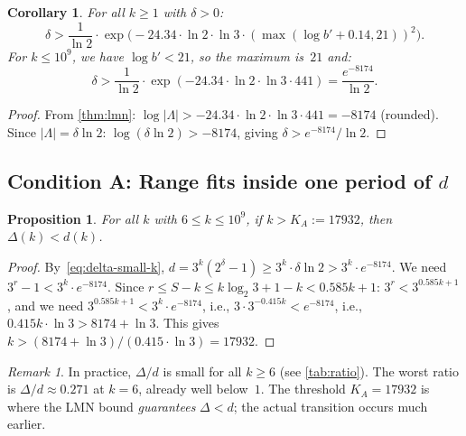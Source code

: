 \documentclass[11pt, a4paper]{amsart}
\theoremstyle{plain}
\newtheorem{proposition}[theorem]{Proposition}
\newtheorem{corollary}[theorem]{Corollary}
\theoremstyle{definition}
\theoremstyle{remark}
\newtheorem{remark}[theorem]{Remark}
\begin{document}
\begin{corollary}\label{cor:delta-bound}
  For all $k \geq 1$ with $\delta > 0$:
  \begin{equation}\label{eq:delta-lower}
    \delta > \frac{1}{\ln 2} \cdot
    \exp\!\bigl(-24.34 \cdot \ln 2 \cdot \ln 3 \cdot
    (\max(\log b' + 0.14, 21))^2\bigr).
  \end{equation}
  For $k \leq 10^9$, we have $\log b' < 21$, so the
  maximum is~$21$ and:
  \begin{equation}\label{eq:delta-small-k}
    \delta > \frac{1}{\ln 2} \cdot
    \exp(-24.34 \cdot \ln 2 \cdot \ln 3 \cdot 441)
    = \frac{e^{-8174}}{\ln 2}.
  \end{equation}
\end{corollary}

\begin{proof}
  From \cref{thm:lmn}: $\log|\Lambda| > -24.34 \cdot \ln 2
  \cdot \ln 3 \cdot 441 = -8174$ (rounded).
  Since $|\Lambda| = \delta \ln 2$:
  $\log(\delta \ln 2) > -8174$, giving
  $\delta > e^{-8174} / \ln 2$.
\end{proof}

\subsection{Condition A: Range fits inside one period of $d$}
\label{ssec:condition-a}

\begin{proposition}\label{prop:cond-a}
  For all $k$ with $6 \leq k \leq 10^9$, if
  $k > K_A := 17932$, then $\Delta(k) < d(k)$.
\end{proposition}

\begin{proof}
  By~\eqref{eq:delta-small-k},
  $d = 3^k(2^\delta - 1) \geq 3^k \cdot \delta \ln 2
  > 3^k \cdot e^{-8174}$.
  We need $3^r - 1 < 3^k \cdot e^{-8174}$.
  Since $r \leq S - k \leq k \log_2 3 + 1 - k < 0.585k + 1$:
  $3^r < 3^{0.585k+1}$, and we need
  $3^{0.585k+1} < 3^k \cdot e^{-8174}$, i.e.,
  $3 \cdot 3^{-0.415k} < e^{-8174}$, i.e.,
  $0.415k \cdot \ln 3 > 8174 + \ln 3$.
  This gives $k > (8174 + \ln 3)/(0.415 \cdot \ln 3) = 17932$.
\end{proof}

\begin{remark}\label{rem:practical}
  In practice, $\Delta/d$ is small for all $k \geq 6$
  (see \cref{tab:ratio}).  The worst ratio is $\Delta/d
  \approx 0.271$ at $k = 6$, already well below~$1$.
  The threshold $K_A = 17932$ is where the LMN bound
  \emph{guarantees} $\Delta < d$; the actual transition
  occurs much earlier.
\end{remark}
\end{document}

